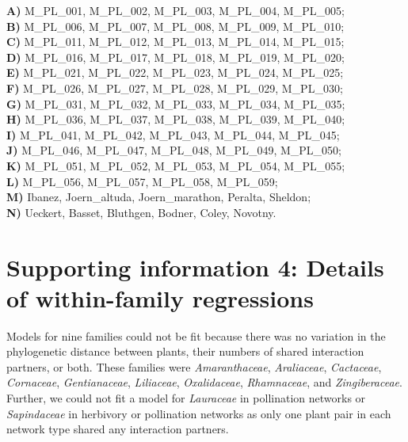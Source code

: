 \documentclass[12pt]{article}
\begin{document}
\begin{spacing}{1.5}
    \noindent \textbf{A)} M\_PL\_001, M\_PL\_002, M\_PL\_003, M\_PL\_004, M\_PL\_005;      \\
    \textbf{B)} M\_PL\_006, M\_PL\_007, M\_PL\_008, M\_PL\_009, M\_PL\_010;    \\
    \textbf{C)} M\_PL\_011, M\_PL\_012, M\_PL\_013, M\_PL\_014, M\_PL\_015;  \\
    \textbf{D)} M\_PL\_016, M\_PL\_017, M\_PL\_018, M\_PL\_019, M\_PL\_020;   \\
    \textbf{E)} M\_PL\_021, M\_PL\_022, M\_PL\_023, M\_PL\_024, M\_PL\_025;  \\
    \textbf{F)} M\_PL\_026, M\_PL\_027, M\_PL\_028, M\_PL\_029, M\_PL\_030;  \\
    \textbf{G)} M\_PL\_031, M\_PL\_032, M\_PL\_033, M\_PL\_034, M\_PL\_035; \\
    \textbf{H)} M\_PL\_036, M\_PL\_037, M\_PL\_038, M\_PL\_039, M\_PL\_040;   \\
    \textbf{I)} M\_PL\_041, M\_PL\_042, M\_PL\_043, M\_PL\_044, M\_PL\_045;\\
    \textbf{J)} M\_PL\_046, M\_PL\_047, M\_PL\_048, M\_PL\_049, M\_PL\_050;  \\
    \textbf{K)} M\_PL\_051, M\_PL\_052, M\_PL\_053, M\_PL\_054, M\_PL\_055;   \\
    \textbf{L)} M\_PL\_056, M\_PL\_057, M\_PL\_058, M\_PL\_059;  \\
    \textbf{M)} Ibanez, Joern\_altuda, Joern\_marathon, Peralta, Sheldon;  \\
    \textbf{N)} Ueckert, Basset, Bluthgen, Bodner, Coley, Novotny.

\clearpage

\section*{Supporting information 4: Details of within-family regressions}

    Models for nine families could not be fit because there was no variation in the phylogenetic distance between plants, their numbers of shared interaction partners, or both. These families were \emph{Amaranthaceae}, \emph{Araliaceae}, \emph{Cactaceae}, \emph{Cornaceae}, \emph{Gentianaceae}, \emph{Liliaceae}, \emph{Oxalidaceae}, \emph{Rhamnaceae}, and \emph{Zingiberaceae}. Further, we could not fit a model for \emph{Lauraceae} in pollination networks or \emph{Sapindaceae} in herbivory or pollination networks as only one plant pair in each network type shared any interaction partners.



\end{spacing}
\end{document}
